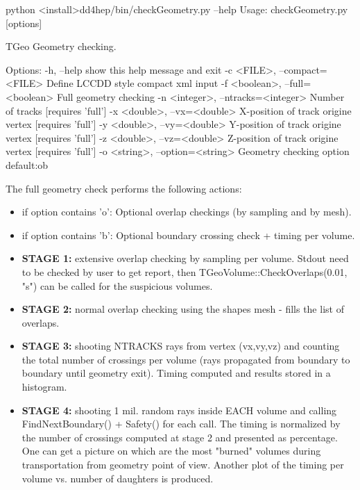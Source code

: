 \documentclass[10pt,a4paper]{article}
\begin{document}
\begin{code}
    python <install>dd4hep/bin/checkGeometry.py --help
    Usage: checkGeometry.py [options]

    TGeo Geometry checking.

    Options:
      -h, --help                            show this help message and exit
      -c <FILE>, --compact=<FILE>           Define LCCDD style compact xml input
      -f <boolean>, --full=<boolean>        Full geometry checking
      -n <integer>, --ntracks=<integer>     Number of tracks [requires 'full']
      -x <double>, --vx=<double>            X-position of track origine vertex [requires 'full']
      -y <double>, --vy=<double>            Y-position of track origine vertex [requires 'full']
      -z <double>, --vz=<double>            Z-position of track origine vertex [requires 'full']
      -o <string>, --option=<string>        Geometry checking option default:ob
\end{code}

The full geometry check performs the 
{following actions}:
\begin{itemize}\itemcompact
\item if option contains 'o': Optional overlap checkings (by sampling and by mesh).
\item if option contains 'b': Optional boundary crossing check + timing per volume.

\item{\bf{STAGE 1:}} extensive overlap checking by sampling per volume. Stdout need to be
  checked by user to get report, then TGeoVolume::CheckOverlaps(0.01, "s") can
  be called for the suspicious volumes.
\item{\bf{STAGE 2:}} normal overlap checking using the shapes mesh - fills the list of
  overlaps.
\item{\bf{STAGE 3:}} shooting NTRACKS rays from vertex (vx,vy,vz) 
   and counting the total number of
  crossings per volume (rays propagated from boundary to boundary until
  geometry exit). Timing computed and results stored in a histogram.
\item{\bf{STAGE 4:}} shooting 1 mil. random rays inside EACH volume and calling
  FindNextBoundary() + Safety() for each call. The timing is normalized by the
  number of crossings computed at stage 2 and presented as percentage.
  One can get a picture on which are the most "burned" volumes during
  transportation from geometry point of view. Another plot of the timing per
  volume vs. number of daughters is produced.
\end{itemize}
\end{document}
